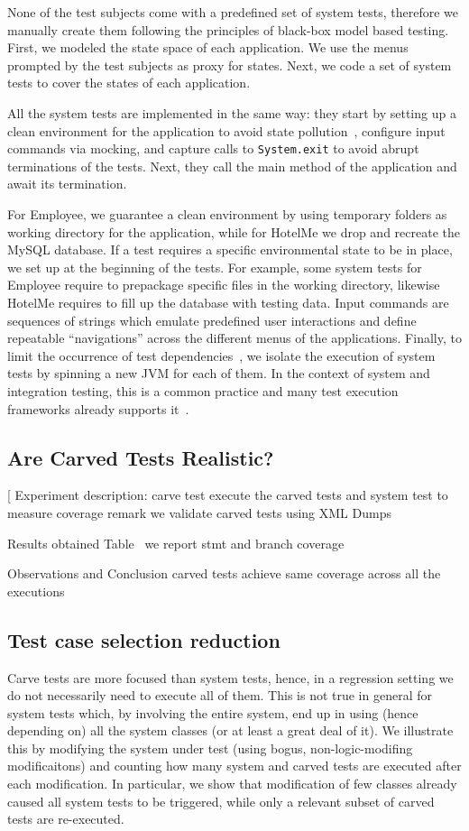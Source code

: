 \documentclass[10pt,conference]{IEEEtran}
\makeatletter
\gdef\xxx{\@ifnextchar[\xxx@lab\xxx@nolab}
\makeatother
\begin{document}
{None of the test subjects come with a predefined set of system tests, therefore we manually create them
following the principles of black-box model based testing.
First, we modeled the state space of each application. We use the menus prompted by the test subjects 
as proxy for states. Next, we code a set of system tests to cover the states of each application.

All the system tests are implemented in the same way:
they start by setting up a clean environment for the application to avoid state pollution~\cite{pollution},
configure input commands via mocking, and capture calls to \texttt{System.exit} to avoid abrupt terminations of the tests.
Next, they call the main method of the application and await its termination.

For Employee, we guarantee a clean environment by using temporary folders as working directory for the application,
while for HotelMe we drop and recreate the MySQL database.
If a test requires a specific environmental state to be in place, we set up at the beginning of the tests.
For example, some system tests for Employee require to prepackage specific files in the working directory, likewise
HotelMe requires to fill up the database with testing data.
%
Input commands are sequences of strings which emulate predefined user interactions and define repeatable ``navigations''
across the different menus of the applications.
Finally, to limit the occurrence of test dependencies~\cite{}, we isolate the execution of system tests by spinning a new JVM
for each of them. In the context of system and integration testing, this is a common practice and many test execution
frameworks already supports it~\cite{surefire:fork}.

\subsection{Are Carved Tests Realistic?}
\xxx{RQ1 and RQ2}
Experiment description:
	carve test
	execute the carved tests and system test to measure coverage
	remark we validate carved tests using XML Dumps

Results obtained Table~
	we report stmt and branch coverage
	
Observations and Conclusion
	carved tests achieve same coverage across all the executions

\subsection{Test case selection reduction}
Carve tests are more focused than system tests, hence, in a regression setting we do not necessarily need 
to execute all of them. This is not true in general for system tests which, by involving the entire system, end up in using (hence depending on)
all the system classes (or at least a great deal of it).
%
We illustrate this by modifying the system under test (using bogus, non-logic-modifing modificaitons) and counting how many system and carved
tests are executed after each modification. In particular, we show that modification of few classes already caused all system tests to be triggered,
while only a relevant subset of carved tests are re-executed.

}
\end{document}
